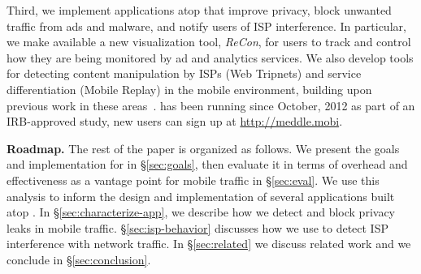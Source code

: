 Third, we implement applications atop \meddle that improve 
privacy, block unwanted traffic from ads and malware, and notify users of ISP interference. 
In particular, we make available a new visualization tool, \emph{ReCon}, for users to track and control how 
they are being monitored by ad and analytics services. 
 We also develop tools for detecting content manipulation by ISPs (Web Tripnets) and 
 service differentiation (Mobile Replay) in the mobile environment, building upon previous 
 work in these areas~\cite{reis:tripwires,dischinger:glasnost}. \meddle has been running since 
October, 2012 as part of an IRB-approved study, new users can sign up at \url{http://meddle.mobi}. 






\noindent\textbf{Roadmap.} The rest of the paper is organized as follows. We present the goals and implementation for \meddle in \S\ref{sec:goals}, then evaluate it in terms of overhead and effectiveness as a vantage point for mobile traffic in \S\ref{sec:eval}. We use this analysis to inform the design and implementation of several applications built atop \meddle. 
In \S\ref{sec:characterize-app}, we describe how we detect and block privacy leaks in mobile traffic. \S\ref{sec:isp-behavior} discusses 
how we use \meddle to detect ISP interference with network traffic. In \S\ref{sec:related} we discuss related work and we conclude in \S\ref{sec:conclusion}.

